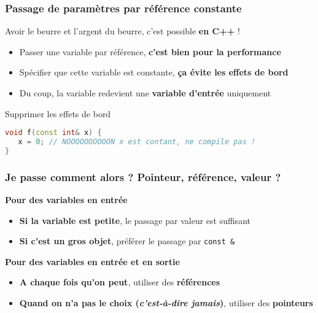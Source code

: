 \documentclass{beamer}
\begin{document}
\begin{frame}[fragile=singleslide,shrink=20]
\frametitle{Passage de paramètres par référence constante}
Avoir le beurre et l'argent du beurre, c'est possible \textbf{en C++} !

\begin{itemize}
\item{Passer une variable par référence, \textbf{c'est bien pour la performance}}
\item{Spécifier que cette variable est constante, \textbf{ça évite les effets de bord}}
\item{Du coup, la variable redevient une \textbf{variable d'entrée} uniquement}
\end{itemize}

\begin{block}{Supprimer les effets de bord}
\begin{lstlisting}[language=c++]
void f(const int& x) {
   x = 0; // NOOOOOOOOOON x est contant, ne compile pas !
}
\end{lstlisting}
\end{block}
\end{frame}

\begin{frame}[fragile=singleslide,shrink=20]
\frametitle{Je passe comment alors ? Pointeur, référence, valeur ?}

\textbf{Pour des variables en entrée}
\begin{itemize}
\item{\textbf{Si la variable est petite}, le passage par valeur est suffisant}
\item{\textbf{Si c'est un gros objet}, préférer le passage par \texttt{const \&}}
\end{itemize}

\textbf{Pour des variables en entrée et en sortie}
\begin{itemize}
\item{\textbf{A chaque fois qu'on peut}, utiliser des \textbf{références}}
\item{\textbf{Quand on n'a pas le choix (\textit{c'est-à-dire jamais})}, utiliser des \textbf{pointeurs}}
\end{itemize}
\end{frame}
\end{document}
